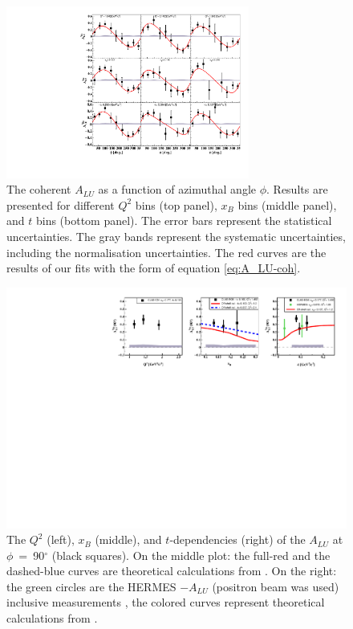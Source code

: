 \documentclass[twocolumn,nofootinbib,showpacs,prl,superscriptaddress,secnumarabic,amssymb,nobibnotes,aps,floatfix]{revtex4}
\begin{document}
\begin{figure}[tb]
\includegraphics[width=8cm]{figs/coherent-ALU.pdf}
\caption{The coherent $A_{LU}$ as a function of azimuthal angle $\phi$. Results are presented
   for different $Q^{2}$ bins (top panel), $x_{B}$ bins (middle panel), and $t$ 
   bins (bottom panel).  The error bars represent the statistical 
   uncertainties. The gray bands represent the systematic uncertainties, 
   including the normalisation uncertainties. The red curves are the results of 
our fits with the form of equation \ref{eq:A_LU-coh}.}
\label{fig:alu}
\end{figure}

\begin{figure}[tb]
\includegraphics[width=17cm]{figs/coherent-ALU_90_2.pdf}
\caption{The $Q^{2}$ (left), $x_{B}$ (middle), and $t$-dependencies (right) of
   the $A_{LU}$ at $\phi$~=~90$^{\circ}$ (black squares). On the 
   middle plot: the full-red and the dashed-blue curves are theoretical 
   calculations from \cite{simonetta_2}. On the right: the green circles are 
   the HERMES $-A_{LU}$ (positron beam was used) inclusive measurements 
   \cite{Airapetian}, the colored curves represent theoretical calculations 
   from \cite{simonetta_2}.}
\label{fig:alu90}
\end{figure}
\end{document}

